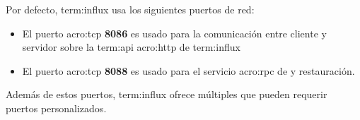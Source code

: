Por defecto, \gls{term:influx} usa los siguientes puertos de red:

\begin{itemize}

  \item
  El puerto \gls{acro:tcp} \textbf{8086} es usado para la comunicación entre cliente y
  servidor sobre la \gls{term:api} \gls{acro:http} de \gls{term:influx}

  \item
    El puerto \gls{acro:tcp} \textbf{8088} es usado para el servicio \gls{acro:rpc} de  y
  restauración.

\end{itemize}

Además de estos puertos, \gls{term:influx} ofrece múltiples  que pueden
requerir puertos personalizados.
